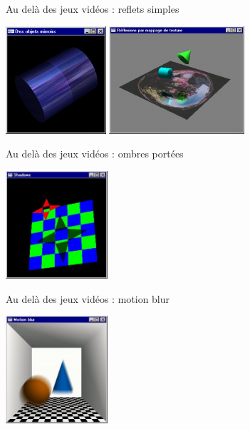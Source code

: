 \begin{frame}[t]{Au delà des jeux vidéos : reflets simples}
  \begin{center}
    \includegraphics[height=4cm]{figs/reflets1.png}
    \hspace{0.5cm}
    \includegraphics[height=4cm]{figs/reflets2.png}
  \end{center}
\end{frame}

\begin{frame}[t]{Au delà des jeux vidéos : ombres portées}
  \begin{center}
    \includegraphics[height=4cm]{figs/shadow1.png}
  \end{center}
\end{frame}

\begin{frame}[t]{Au delà des jeux vidéos : motion blur}
  \begin{center}
    \includegraphics[height=4cm]{figs/motionblur.png}
  \end{center}
\end{frame}

